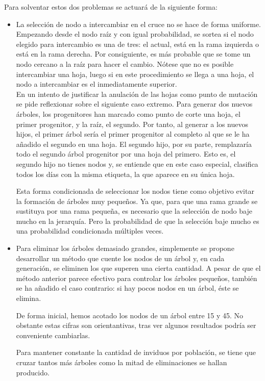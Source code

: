 Para solventar estos dos problemas se actuar\'a de la siguiente forma:

\begin{itemize}
    \item La selecci\'on de nodo a intercambiar en el cruce no se hace de forma uniforme. Empezando desde el nodo ra\'iz y con igual probabilidad, se sortea si el nodo elegido para intercambio es una de tres: el actual, est\'a en la rama izquierda o est\'a en la rama derecha. Por consiguiente, es m\'as probable que se tome un nodo cercano a la ra\'iz para hacer el cambio. N\'otese que no es posible intercambiar una hoja, luego si en este procedimiento se llega a una hoja, el nodo a intercambiar es el inmediatamente superior.\\
    
    En un intento de justificar la anulaci\'on de las hojas como punto de mutaci\'on se pide reflexionar sobre el siguiente caso extremo. Para generar dos nuevos \'arboles, los progenitores han marcado como punto de corte una hoja, el primer progenitor, y la ra\'iz, el segundo. Por tanto, al generar a los nuevos hijos, el primer \'arbol ser\'ia el primer progenitor al completo al que se le ha a\~nadido el segundo en una hoja. El segundo hijo, por su parte, remplazar\'ia todo el segundo \'arbol progenitor por una hoja del primero. Esto es, el segundo hijo no tienes nodos y, se entiende que en este caso especial, clasifica todos los d\'ias con la misma etiqueta, la que aparece en su \'unica hoja. 
    
    Esta forma condicionada de seleccionar los nodos tiene como objetivo evitar la formaci\'on de \'arboles muy peque\~nos. Ya que, para que una rama grande se sustituya por una rama peque\~na, es necesario que la selecci\'on de nodo baje mucho en la jerarqu\'ia. Pero la probabilidad de que la selecci\'on baje mucho es una probabilidad condicionada m\'ultiples veces.
    
    \item Para eliminar los \'arboles demasiado grandes, simplemente se propone desarrollar un m\'etodo que cuente los nodos de un \'arbol y, en cada generaci\'on, se eliminen los que superen una cierta cantidad. A pesar de que el m\'etodo anterior parece efectivo para controlar los \'arboles peque\~nos, tambi\'en se ha a\~nadido el caso contrario: si hay pocos nodos en un \'arbol, \'este se elimina. 
    
    De forma inicial, hemos acotado los nodos de un \'arbol entre 15 y 45. No obstante estas cifras son orientantivas, tras ver algunos resultados podr\'ia ser conveniente cambiarlas.
    
    Para mantener constante la cantidad de inviduos por poblaci\'on, se tiene que cruzar tantos m\'as \'arboles como la mitad de eliminaciones se hallan producido.
\end{itemize}{}


